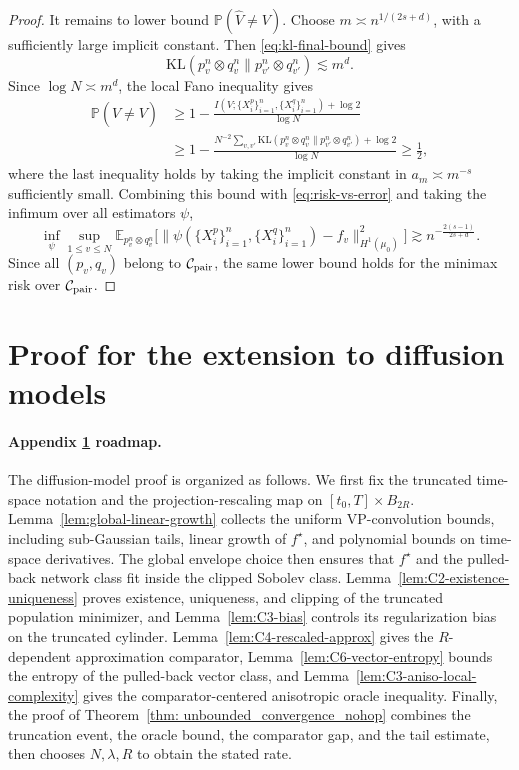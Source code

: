 \documentclass[11pt]{article}
\newcommand{\E}{\mathbb{E}}
\newcommand{\KL}{\mathrm{KL}}
\newcommand{\PP}{\mathbb{P}}
\theoremstyle{plain}
\theoremstyle{definition}
\theoremstyle{remark}
\begin{document}
\begin{proof}
It remains to lower bound \(\PP(\widehat V\neq V)\). Choose
\(m\asymp n^{1/(2s+d)}\), with a sufficiently large implicit constant. Then
\eqref{eq:kl-final-bound} gives
\[
  \KL(p_v^n\otimes q_v^n\|p_{v'}^n\otimes q_{v'}^n)
  \lesssim m^d.
\]
Since \(\log N\asymp m^d\), the local Fano inequality
\cite{takezawa2005introduction} gives
\[
\begin{aligned}
  \PP(\widehat V\neq V)
  &\ge
  1-
  \frac{
    I(V;\{X_i^p\}_{i=1}^n,\{X_i^q\}_{i=1}^n)+\log 2
  }{\log N}\\
  &\ge
  1-
  \frac{
    N^{-2}\sum_{v,v'}
    \KL(p_v^n\otimes q_v^n\|p_{v'}^n\otimes q_{v'}^n)
    +\log 2
  }{\log N}
  \ge \frac12,
\end{aligned}
\]
where the last inequality holds by taking the implicit constant in
\(a_m\asymp m^{-s}\) sufficiently small. Combining this bound with
\eqref{eq:risk-vs-error} and taking the infimum over all estimators \(\psi\),
\[
  \inf_{\psi}
  \sup_{1\le v\le N}
  \E_{p_v^n\otimes q_v^n}
  \big[
    \|\psi(\{X_i^p\}_{i=1}^n,\{X_i^q\}_{i=1}^n)-f_v\|_{H^1(\mu_0)}^2
  \big]
  \gtrsim
  n^{-\frac{2(s-1)}{2s+d}}.
\]
Since all \((p_v,q_v)\) belong to \(\mathcal C_{\rm pair}\), the same lower bound holds
for the minimax risk over \(\mathcal C_{\rm pair}\).
\end{proof}


\section{Proof for the extension to diffusion models}
\label{sec:proof_unbounded}
\paragraph{Appendix \ref{sec:proof_unbounded} roadmap.}
The diffusion-model proof is organized as follows. We first fix the truncated
time-space notation and the projection-rescaling map on
\([t_0,T]\times B_{2R}\). Lemma~\ref{lem:global-linear-growth} collects the
uniform VP-convolution bounds, including sub-Gaussian tails, linear growth of
\(f^\star\), and polynomial bounds on time-space derivatives. The global
envelope choice then ensures that \(f^\star\) and the pulled-back network
class fit inside the clipped Sobolev class. Lemma~\ref{lem:C2-existence-uniqueness}
proves existence, uniqueness, and clipping of the truncated population
minimizer, and Lemma~\ref{lem:C3-bias} controls its regularization bias on
the truncated cylinder. Lemma~\ref{lem:C4-rescaled-approx} gives the
\(R\)-dependent approximation comparator, Lemma~\ref{lem:C6-vector-entropy}
bounds the entropy of the pulled-back vector class, and
Lemma~\ref{lem:C3-aniso-local-complexity} gives the comparator-centered
anisotropic oracle inequality. Finally, the proof of
Theorem~\ref{thm: unbounded_convergence_nohop} combines the truncation event,
the oracle bound, the comparator gap, and the tail estimate, then chooses
\(N,\lambda,R\) to obtain the stated rate.
\end{document}
